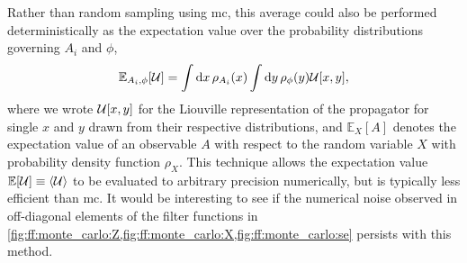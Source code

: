 Rather than random sampling using \gls{mc}, this average could also be performed deterministically as the expectation value over the probability distributions governing $A_i$ and $\phi$,
\begin{equation}
    \mathbb{E}_{A_i,\phi}[\mathcal{U}] = \int\dd{x}\rho_{A_i}(x)\int\dd{y}\rho_{\phi}(y)\mathcal{U}[x, y],
\end{equation}
where we wrote $\mathcal{U}[x, y]$ for the Liouville representation of the propagator for single $x$ and $y$ drawn from their respective distributions, and $\mathbb{E}_X[A]$ denotes the expectation value of an observable $A$ with respect to the random variable $X$ with probability density function $\rho_X$.
This technique allows the expectation value $\mathbb{E}[\liouvU]\equiv\ev{\liouvU}$ to be evaluated to arbitrary precision numerically, but is typically less efficient than \gls{mc}.
It would be interesting to see if the numerical noise observed in off-diagonal elements of the filter functions in \cref{fig:ff:monte_carlo:Z,fig:ff:monte_carlo:X,fig:ff:monte_carlo:se} persists with this method.
